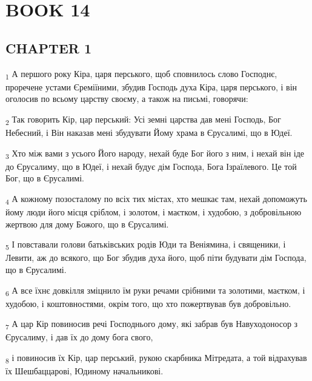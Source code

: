 \section{BOOK 14}
\subsection{CHAPTER 1}
\begin{tcolorbox}
\textsubscript{1} А першого року Кіра, царя перського, щоб сповнилось слово Господнє, проречене устами Єреміїними, збудив Господь духа Кіра, царя перського, і він оголосив по всьому царству своєму, а також на письмі, говорячи:
\end{tcolorbox}
\begin{tcolorbox}
\textsubscript{2} Так говорить Кір, цар перський: Усі земні царства дав мені Господь, Бог Небесний, і Він наказав мені збудувати Йому храма в Єрусалимі, що в Юдеї.
\end{tcolorbox}
\begin{tcolorbox}
\textsubscript{3} Хто між вами з усього Його народу, нехай буде Бог його з ним, і нехай він іде до Єрусалиму, що в Юдеї, і нехай будує дім Господа, Бога Ізраїлевого. Це той Бог, що в Єрусалимі.
\end{tcolorbox}
\begin{tcolorbox}
\textsubscript{4} А кожному позосталому по всіх тих містах, хто мешкає там, нехай допоможуть йому люди його місця сріблом, і золотом, і маєтком, і худобою, з добровільною жертвою для дому Божого, що в Єрусалимі.
\end{tcolorbox}
\begin{tcolorbox}
\textsubscript{5} І повставали голови батьківських родів Юди та Веніямина, і священики, і Левити, аж до всякого, що Бог збудив духа його, щоб піти будувати дім Господа, що в Єрусалимі.
\end{tcolorbox}
\begin{tcolorbox}
\textsubscript{6} А все їхнє довкілля зміцнило їм руки речами срібними та золотими, маєтком, і худобою, і коштовностями, окрім того, що хто пожертвував був добровільно.
\end{tcolorbox}
\begin{tcolorbox}
\textsubscript{7} А цар Кір повиносив речі Господнього дому, які забрав був Навуходоносор з Єрусалиму, і дав їх до дому бога свого,
\end{tcolorbox}
\begin{tcolorbox}
\textsubscript{8} і повиносив їх Кір, цар перський, рукою скарбника Мітредата, а той відрахував їх Шешбаццарові, Юдиному начальникові.
\end{tcolorbox}
